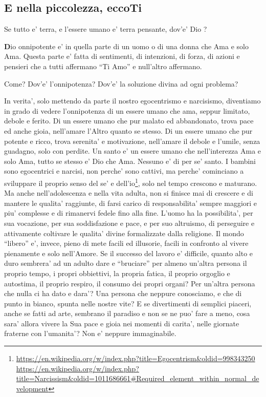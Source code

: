 \subsection{E nella piccolezza, eccoTi}
\label{DioPadreOnnipotenteDef}

Se tutto e' terra, e l'essere umano e' terra pensante, dov'e' Dio ?

\textbf{D}io onnipotente e' in quella parte di un uomo o di una donna che Ama e solo Ama.
Questa parte e' fatta di sentimenti, di intenzioni, di forza, di azioni e pensieri che a tutti affermano ``Ti Amo'' e null'altro affermano.

Come? Dov'e' l'onnipotenza? Dov'e' la soluzione divina ad ogni problema?

In verita', solo mettendo da parte il nostro egocentrismo e narcisismo, diventiamo in grado di vedere l'onnipotenza di un essere umano che ama, seppur limitato, debole e ferito. Di un essere umano che pur malato ed abbandonato, trova pace ed anche gioia, nell'amare l'Altro quanto se stesso. Di un essere umano che pur potente e ricco, trova serenita' e motivazione, nell'amare il debole e l'umile, senza guadagno, solo con perdite.
Un santo e' un essere umano che nell'interezza Ama e solo Ama, tutto se stesso e' Dio che Ama. Nessuno e' di per se' santo. I bambini sono egocentrici e narcisi, non perche' sono cattivi, ma perche' cominciano a sviluppare il proprio senso del se' e dell'io\footnote{\url{https://en.wikipedia.org/w/index.php?title=Egocentrism\&oldid=998343250} \url{https://en.wikipedia.org/w/index.php?title=Narcissism\&oldid=1011686661\#Required\_element\_within\_normal\_development}}, solo nel tempo crescono e maturano.  Ma anche nell'adolescenza e nella vita adulta, non si finisce mai di crescere e di mantere le qualita' raggiunte, di farsi carico di responsabilita' sempre maggiori e piu' complesse e di rimanervi fedele fino alla fine. L'uomo ha la possibilita', per sua vocazione, per sua soddisfazione e pace, e per suo altruismo, di perseguire e attivamente coltivare le qualita' divine formalizzate dalla religione. Il mondo ``libero'' e', invece, pieno di mete facili ed illusorie, facili in confronto al vivere pienamente e solo nell'Amore. Se il successo del lavoro e' difficile, quanto alto e duro sembrera' ad un adulto dare e ``bruciare'' per almeno un'altra persona il proprio tempo, i propri obbiettivi, la propria fatica, il proprio orgoglio e autostima, il proprio respiro, il consumo dei propri organi? Per un'altra persona che nulla ci ha dato e dara'? Una persona che neppure conosciamo, e che di punto in bianco, spunta nelle nostre vite? E se divertimenti di semplici piaceri, anche se fatti ad arte, sembrano il paradiso e non se ne puo' fare a meno, cosa sara' allora vivere la Sua pace e gioia nei momenti di carita', nelle giornate fraterne con l'umanita'? Non e' neppure immaginabile. 

